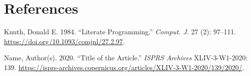 \documentclass[
  letterpaper,
  DIV=11,
  numbers=noendperiod]{scrreprt}
\newlength{\cslhangindent}
\newenvironment{CSLReferences}[2] %
 {\begin{list}{}{%
  \setlength{\itemindent}{0pt}
  \setlength{\leftmargin}{0pt}
  \setlength{\parsep}{0pt}
  \ifodd #1
   \setlength{\leftmargin}{\cslhangindent}
   \setlength{\itemindent}{-1\cslhangindent}
  \fi
  \setlength{\itemsep}{#2\baselineskip}}}
 {\end{list}}
\begin{document}
\chapter*{References}\label{references-1}


\label{refs}
\begin{CSLReferences}{1}{0}
Knuth, Donald E. 1984. {``Literate Programming.''} \emph{Comput. J.} 27
(2): 97--111. \url{https://doi.org/10.1093/comjnl/27.2.97}.

Name, Author(s). 2020. {``Title of the Article.''} \emph{ISPRS Archives}
XLIV-3-W1-2020: 139.
\url{https://isprs-archives.copernicus.org/articles/XLIV-3-W1-2020/139/2020/}.

\end{CSLReferences}
\end{document}
